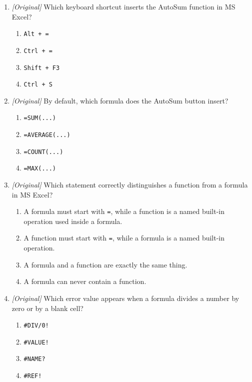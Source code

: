 \documentclass[11pt]{article}
\begin{document}
\begin{enumerate}[label=\textbf{Q\arabic*.}, leftmargin=*]
\begin{enumerate}[label=\Alph*.]
    \item \texttt{ADD}
    \item \texttt{TOTAL}
    \item \texttt{PLUS}
  \end{enumerate}
\item \textit{[Original]} Which keyboard shortcut inserts the AutoSum function
  in MS Excel?
  \begin{enumerate}[label=\Alph*.]
    \item \texttt{Alt + =}
    \item \texttt{Ctrl + =}
    \item \texttt{Shift + F3}
    \item \texttt{Ctrl + S}
  \end{enumerate}
\item \textit{[Original]} By default, which formula does the AutoSum button
  insert?
  \begin{enumerate}[label=\Alph*.]
    \item \texttt{=SUM(...)}
    \item \texttt{=AVERAGE(...)}
    \item \texttt{=COUNT(...)}
    \item \texttt{=MAX(...)}
  \end{enumerate}
\item \textit{[Original]} Which statement correctly distinguishes a function
  from a formula in MS Excel?
  \begin{enumerate}[label=\Alph*.]
    \item A formula must start with \texttt{=}, while a function is a named
      built-in operation used inside a formula.
    \item A function must start with \texttt{=}, while a formula is a named
      built-in operation.
    \item A formula and a function are exactly the same thing.
    \item A formula can never contain a function.
  \end{enumerate}
\item \textit{[Original]} Which error value appears when a formula divides a
  number by zero or by a blank cell?
  \begin{enumerate}[label=\Alph*.]
    \item \texttt{\#DIV/0!}
    \item \texttt{\#VALUE!}
    \item \texttt{\#NAME?}
    \item \texttt{\#REF!}

\end{enumerate}
\end{enumerate}
\end{document}
